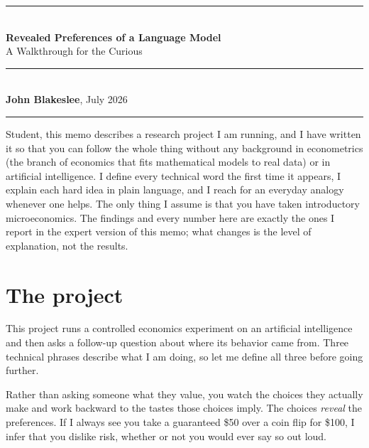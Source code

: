 \documentclass[11pt]{article}
\begin{document}
\begin{flushleft}
{\color{rulegray}\rule{\linewidth}{1.2pt}}\\[9pt]
{\LARGE\bfseries\color{ink} Revealed Preferences of a Language Model}\\[6pt]
{\Large\color{mossdk} A Walkthrough for the Curious}\\[10pt]
{\color{rulegray}\rule{\linewidth}{0.8pt}}\\[6pt]
{\small\color{ink}\textbf{John Blakeslee}, July 2026}\\[3pt]
{\color{rulegray}\rule{\linewidth}{1.2pt}}
\end{flushleft}

\vspace{4pt}

Student, this memo describes a research project I am running, and I have written it so that you can
follow the whole thing without any background in econometrics (the branch of economics that fits
mathematical models to real data) or in artificial intelligence. I define every technical word the
first time it appears, I explain each hard idea in plain language, and I reach for an everyday analogy
whenever one helps. The only thing I assume is that you have taken introductory microeconomics. The
findings and every number here are exactly the ones I report in the expert version of this memo; what
changes is the level of explanation, not the results.

\section{The project}

This project runs a controlled economics experiment on an artificial intelligence and then asks a
follow-up question about where its behavior came from. Three technical phrases describe what I am
doing, so let me define all three before going further.

\begin{defbox}
Rather than asking someone what they value, you watch the choices they actually make and work backward
to the tastes those choices imply. The choices \emph{reveal} the preferences. If I always see you take
a guaranteed \$50 over a coin flip for \$100, I infer that you dislike risk, whether or not you would
ever say so out loud.
\end{defbox}
\end{document}
